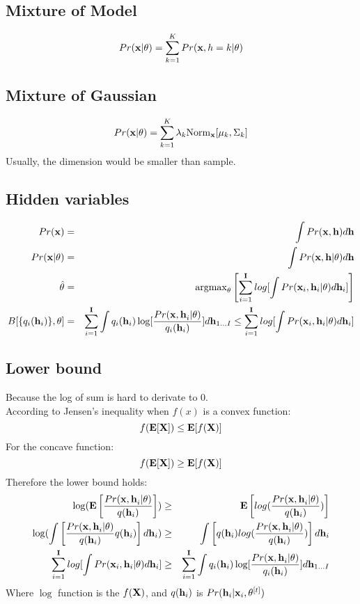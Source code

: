 \documentclass[12pt,a4paper]{article}
\begin{document}
\subsection*{Mixture of Model}
$$
Pr({\bf x|\theta}) = \sum_{k=1}^KPr({\bf x},h=k|\theta)
$$

\subsection*{Mixture of Gaussian}
$$
Pr({\bf x|\theta}) = \sum_{k=1}^{K}\lambda_k{\rm Norm}_{\bf x}[\mu_k,\Sigma_k]
$$
Usually, the dimension would be smaller than sample.
\subsection*{Hidden variables}
\begin{eqnarray*}
Pr({\bf x}) &=& \int Pr({\bf x,h})d{\bf h} \\
Pr({\bf x|\theta}) &=& \int Pr({\bf x,h|\theta})d{\bf h}\\
\hat\theta  &=& {\rm argmax}_\theta\left[\sum_{i=1}^{\bf I}log[\int Pr({\bf x}_i,{\bf h}_i|\theta)d{\bf h}_i]\right] \\
B[\{q_i({\bf h}_i)\},\theta] &=& \sum_{i=1}^{\bf I}\int q_i({\bf h}_i)\log[\frac{Pr({\bf x,h}_i|\theta)}{q_i({\bf h}_i)}]d{\bf h}_{1\ldots I}\le \sum_{i=1}^{\bf I}log[\int Pr({\bf x}_i,{\bf h}_i|\theta)d{\bf h}_i]
\end{eqnarray*}
\subsection*{Lower bound}
Because the log of sum is hard to derivate to 0.\\
According to Jensen's inequality when $f(x)$ is a convex function:
$$
f({\bf E[X]}) \le {\bf E}[f({\bf X})] 
$$
For the concave function:
$$
f({\bf E[X]}) \ge {\bf E}[f({\bf X})] 
$$
Therefore the lower bound holds:
\begin{eqnarray*}
\log({\bf E}\left[\frac{Pr({\bf x,h}_i|\theta)}{q({\bf h}_i)}\right]) &\ge& {\bf E}\left[log(\frac{Pr({\bf x,h}_i|\theta)}{q({\bf h}_i)})\right] \\
\log(\int \left[\frac{Pr({\bf x,h}_i|\theta)}{q({\bf h}_i)}q({\bf h}_i)\right]d{\bf h}_i) &\ge& \int \left[q({\bf h}_i)log(\frac{Pr({\bf x,h}_i|\theta)}{q({\bf h}_i)})\right]d{\bf h}_i \\
\sum_{i=1}^{\bf I}log[\int Pr({\bf x}_i,{\bf h}_i|\theta)d{\bf h}_i] &\ge & \sum_{i=1}^{\bf I}\int q_i({\bf h}_i)\log[\frac{Pr({\bf x,h}_i|\theta)}{q_i({\bf h}_i)}]d{\bf h}_{1\ldots I}
\end{eqnarray*}
Where $\log$ function is the $f({\bf X})$, and $q({\bf h}_i)$ is $Pr({\bf h}_i|{\bf x}_i,\theta^{[t]})$
\end{document}
